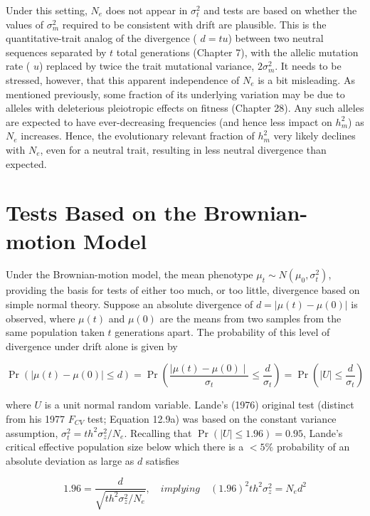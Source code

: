 \documentclass{article}
\begin{document}
Under this setting,  $ N_e $ does not appear in  $ \sigma_t^2 $ and tests are based on whether the values of  $ \sigma_m^2 $ required to be consistent with drift are plausible. This is the quantitative-trait analog of the divergence ( $ d = tu $) between two neutral sequences separated by  $ t $ total generations (Chapter 7), with the allelic mutation rate ( $ u $) replaced by twice the trait mutational variance,  $ 2\sigma_m^2 $. It needs to be stressed, however, that this apparent independence of  $ N_e $ is a bit misleading. As mentioned previously, some fraction of its underlying variation may be due to alleles with deleterious pleiotropic effects on fitness (Chapter 28). Any such alleles are expected to have ever-decreasing frequencies (and hence less impact on  $ h_m^2 $) as  $ N_e $ increases. Hence, the evolutionary relevant fraction of  $ h_m^2 $ very likely declines with  $ N_e $, even for a neutral trait, resulting in less neutral divergence than expected.

\section{Tests Based on the Brownian-motion Model}
Under the Brownian-motion model, the mean phenotype  $ \mu_t \sim N(\mu_0, \sigma_t^2) $, providing the basis for tests of either too much, or too little, divergence based on simple normal theory. Suppose an absolute divergence of  $ d = |\mu(t) - \mu(0)| $ is observed, where  $ \mu(t) $ and  $ \mu(0) $ are the means from two samples from the same population taken  $ t $ generations apart. The probability of this level of divergence under drift alone is given by

\begin{equation}
\Pr\left(\mid\mu(t)-\mu(0)\mid\leq d\right)=\Pr\left(\frac{\mid\mu(t)-\mu(0)\mid}{\sigma_{t}}\leq\frac{d}{\sigma_{t}}\right)=\Pr\left(\mid U\mid\leq\frac{d}{\sigma_{t}}\right)
\tag{12.17}
\label{eq:12_17}
\end{equation}

where $U$ is a unit normal random variable. Lande’s (1976) original test (distinct from his 1977 $F_{CV}$ test; Equation 12.9a) was based on the constant variance assumption, $\sigma_t^2 = th^2 \sigma_z^2 / N_e$. Recalling that $\Pr(|U| \leq 1.96) = 0.95$, Lande’s critical effective population size below which there is a $< 5\%$ probability of an absolute deviation as large as $d$ satisfies

\begin{equation}
1.96=\frac{d}{\sqrt{th^{2}\sigma_{z}^{2}/N_{e}}},\quad implying\quad(1.96)^{2}th^{2}\sigma_{z}^{2}=N_{e}d^{2}
\tag{12.18a}
\label{eq:12_18a}
\end{equation}
\end{document}
